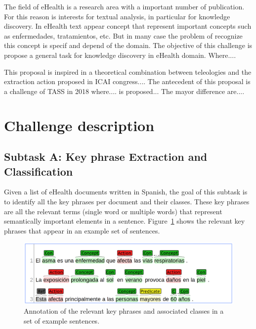 \documentclass[11pt,a4paper]{article}
\begin{document}

The field of eHealth is a research area with a important number of publication.
For this reason is interests for textual analysis, in particular for knowledge
discovery. In eHealth text appear concept that represent important concepts such as
enfermedades, tratamientos, etc.
But in many case the problem of recognize this concept is specif and depend of the domain.
The objective of this challenge is propose a general task for knowledge discovery in eHealth domain. Where....


This proposal is inspired in a theoretical combination between teleologies and the extraction action proposed in ICAI congress....
The antecedent of this proposal is a challenge of TASS in 2018 where.... is proposed...
The mayor difference are....

\section{Challenge description}\label{sec:sota}


\subsection{Subtask A: Key phrase Extraction and Classification}\label{sec:taskA}


Given a list of eHealth documents written in Spanish, the goal of this subtask is to identify all the key phrases per document and their classes. These key phrases are all the relevant terms (single word or multiple words) that represent semantically important elements in a sentence. Figure~\ref{fig:subtaskA} shows the relevant key phrases that appear in an example set of sentences.

\begin{figure}[htbp]
    \centering
    \includegraphics[width=\columnwidth]{task_a.png}
    \caption{Annotation of the relevant key phrases and associated classes in a set of example sentences.}
    \label{fig:subtaskA}
\end{figure}
\end{document}
